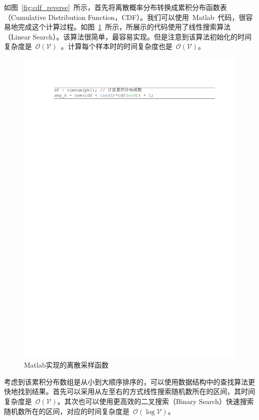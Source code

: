 如图~\ref{fig:cdf_reverse}~所示，首先将离散概率分布转换成累积分布函数表（Cumulative Distribution Function，CDF）。我们可以使用~Matlab~代码，很容易地完成这个计算过程。如图~\ref{fig:sample}~所示，所展示的代码使用了线性搜索算法（Linear Search）。该算法很简单，最容易实现。但是注意到该算法初始化的时间复杂度是~$\mathcal{O(\mathcal{V})}$~。计算每个样本时的时间复杂度也是~$\mathcal{O(V)}$。
\begin{figure}[!t]
  \centering
\includegraphics[width=1\linewidth]{./figures/cdf.pdf}
\caption{Matlab实现的离散采样函数}\label{fig:sample}
\end{figure}


考虑到该累积分布数组是从小到大顺序排序的，可以使用数据结构中的查找算法更快地找到结果。首先可以采用从左至右的方式线性搜索随机数所在的区间，其时间复杂度是~$\mathcal{O}(\mathcal{V})$。其次也可以使用更高效的二叉搜索（Binary Search）快速搜索随机数所在的区间，对应的时间复杂度是~$\mathcal{O}(\log \mathcal{V})$。



